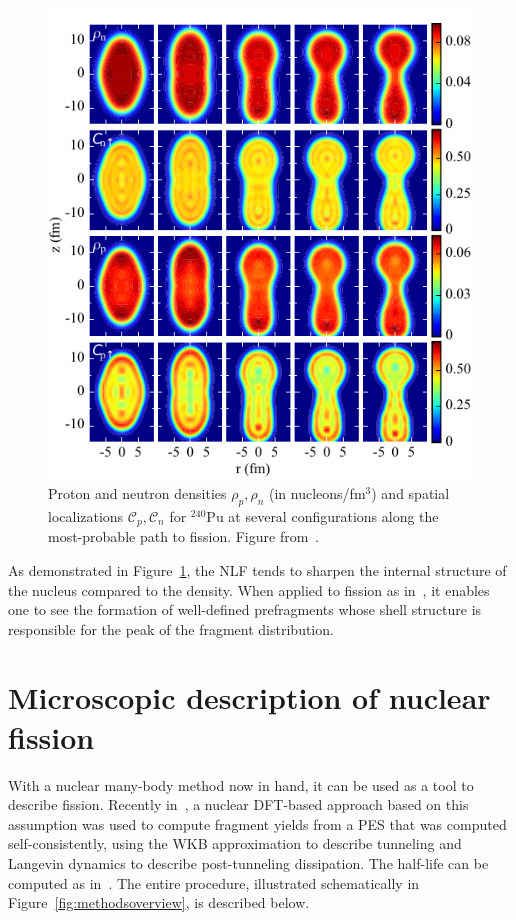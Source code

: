 \begin{figure}
	\centering
	\includegraphics[width=0.5\linewidth]{TeX_files/methods_locali}
	\caption[Proton and neutron densities $\rho_p,\rho_n$ (in nucleons/fm$^3$) and spatial localizations $\mathcal{C}_p,\mathcal{C}_n$ for $^{240}$Pu at several configurations along the most-probable path to fission. Figure from~\cite{Zhang2016}.]{Proton and neutron densities $\rho_p,\rho_n$ (in nucleons/fm$^3$) and spatial localizations $\mathcal{C}_p,\mathcal{C}_n$ for $^{240}$Pu at several configurations along the most-probable path to fission. Figure from~\cite{Zhang2016}.}
	\label{fig:methodslocali}
\end{figure}

As demonstrated in Figure~\ref{fig:methodslocali}, the NLF tends to sharpen the internal structure of the nucleus compared to the density. When applied to fission as in~\cite{Sadhukhan2017}, it enables one to see the formation of well-defined prefragments whose shell structure is responsible for the peak of the fragment distribution.


\section{Microscopic description of nuclear fission}\label{sect:fissionmethod}
With a nuclear many-body method now in hand, it can be used as a tool to describe fission. Recently in~\cite{Sadhukhan2016}, a nuclear DFT-based approach based on this assumption was used to compute fragment yields from a PES that was computed self-consistently, using the WKB approximation to describe tunneling and Langevin dynamics to describe post-tunneling dissipation. The half-life can be computed as in~\cite{Sadhukhan2013}. The entire procedure, illustrated schematically in Figure~\ref{fig:methodsoverview}, is described below.

